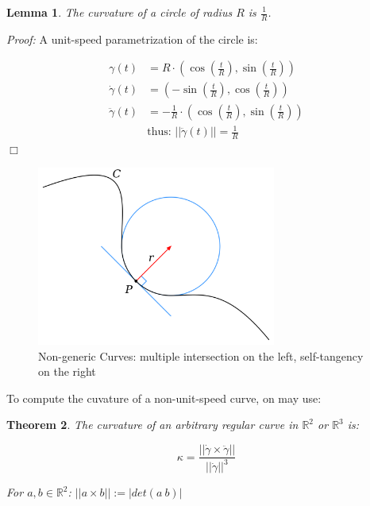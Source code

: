 \documentclass[a4paper,11pt,notitlepage,fullpage]{paper}
\theoremstyle{plain}
\newtheorem{thm}{Theorem}[section] %
\newtheorem{lem}[thm]{Lemma}
\theoremstyle{definition}
\begin{document}
\begin{lem}
The curvature of a circle of radius $R$ is $\frac{1}{R}$.
\end{lem}

\emph{Proof:} A unit-speed parametrization of the circle is:

\begin{align*}
\gamma(t) &= R \cdot \left(\cos\left(\frac{t}{R}\right), \sin\left(\frac{t}{R}\right)\right) \\
\dot\gamma(t) &= \left(-\sin\left(\frac{t}{R}\right), \cos\left(\frac{t}{R}\right)\right) \\
\ddot\gamma(t) &= -\frac{1}{R} \cdot \left(\cos\left(\frac{t}{R}\right), \sin\left(\frac{t}{R}\right)\right) \\
&\text{thus: } ||\ddot\gamma(t)|| = \frac{1}{R} 
\end{align*}
\hfill $\Box$

\begin{figure}
\centering
\includegraphics[width = 0.7\textwidth]{img/schmiegekreis}
\caption{Non-generic Curves: multiple intersection on the left, self-tangency on the right}
\label{fig:non-generic}
\end{figure}


To compute the cuvature of a non-unit-speed curve, on may use:

\begin{thm}
The curvature of an arbitrary regular curve in $\mathbb R^2$ or $\mathbb R^3$ is:

\begin{equation*}
\kappa = \frac{||\dot\gamma \times \ddot\gamma||}{||\dot\gamma||^3}
\end{equation*}

For $a, b \in \mathbb R^2$: $||a \times b|| := |det(a~b)|$
\end{thm}
\end{document}
